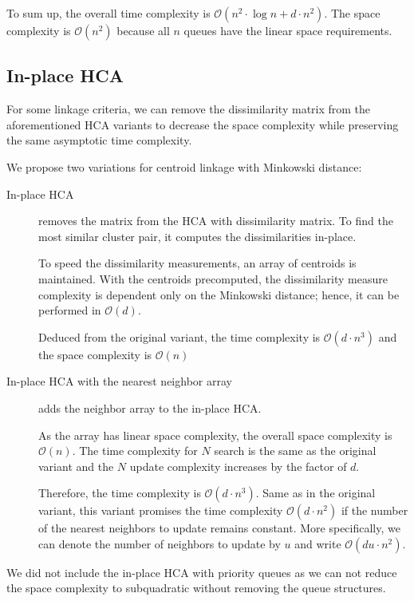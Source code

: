 To sum up, the overall time complexity is $\mathcal{O}(n^2\cdot\log{n}+d\cdot n^2)$. The space complexity is $\mathcal{O}(n^2)$ because all $n$ queues have the linear space requirements.


\subsection{In-place HCA}

For some linkage criteria, we can remove the dissimilarity matrix from the aforementioned HCA variants to decrease the space complexity while preserving the same asymptotic time complexity.

We propose two variations for centroid linkage with Minkowski distance:

\begin{description}
	\item[In-place HCA] removes the matrix from the HCA with dissimilarity matrix. To find the most similar cluster pair, it computes the dissimilarities in-place. 
	
	To speed the dissimilarity measurements, an array of centroids is maintained. With the centroids precomputed, the dissimilarity measure complexity is dependent only on the Minkowski distance; hence, it can be performed in $\mathcal{O}(d)$.
	
	Deduced from the original variant, the time complexity is $\mathcal{O}(d\cdot n^3)$ and the space complexity is $\mathcal{O}(n)$
	
	\item[In-place HCA with the nearest neighbor array] adds the neighbor array to the in-place HCA. 
	
	As the array has linear space complexity, the overall space complexity is $\mathcal{O}(n)$. The time complexity for $N$ search is the same as the original variant and the $N$ update complexity increases by the factor of $d$.
	
	Therefore, the time complexity is $\mathcal{O}(d\cdot n^3)$. Same as in the original variant, this variant promises the time complexity  $\mathcal{O}(d\cdot n^2)$ if the number of the nearest neighbors to update remains constant. More specifically, we can denote the number of neighbors to update by $u$ and write $\mathcal{O}(du\cdot n^2)$.
\end{description}

We did not include the in-place HCA with priority queues as we can not reduce the space complexity to subquadratic without removing the queue structures.

